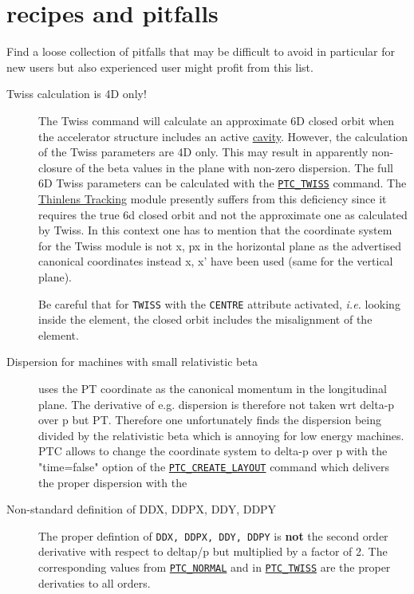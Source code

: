 
\chapter{\madx recipes and pitfalls}

Find a loose collection of pitfalls that may be difficult to avoid in
particular for new users but also experienced user might profit from
this list.  


\begin{description}

\item[Twiss calculation is 4D only!]  The Twiss command will calculate
  an approximate 6D closed orbit when the accelerator structure includes
  an active \hyperref[sec:rf-cavity]{cavity}. However, the calculation of
  the Twiss parameters are 4D only. This may result in apparently
  non-closure of the beta values in the plane with non-zero
  dispersion. The full 6D Twiss parameters can be calculated with the
  \hyperref[chap:ptc-twiss]{\texttt{PTC\_TWISS}} command.  The
  \hyperref[chap:thintrack]{Thinlens Tracking} module presently suffers
  from this deficiency since it requires the true 6d closed orbit and
  not the approximate one as calculated by Twiss. In this context one
  has to mention that the coordinate system for the Twiss module is not
  x, px in the horizontal plane as the advertised canonical coordinates
  instead x, x' have been used (same for the vertical plane).
  
  Be careful that for \texttt{TWISS} with the \texttt{CENTRE} attribute
  activated, \textsl{i.e.} looking inside the element, the closed orbit
  includes the misalignment of the element.  

  
\item[Dispersion for machines with small relativistic beta] 
  \madx uses the PT coordinate as the canonical momentum in the
  longitudinal plane. The derivative of e.g. dispersion is therefore
  not taken wrt delta-p over p but PT. Therefore one unfortunately finds the
  dispersion being divided by the relativistic beta which is annoying
  for low energy machines. PTC allows to change the coordinate system
  to  delta-p over p with the "time=false" option of the
  \hyperref[sec:ptc-create-layout]{\texttt{PTC\_CREATE\_LAYOUT}}
  command which delivers the proper dispersion with the


\item[Non-standard definition of DDX, DDPX, DDY, DDPY] 
  The \madx proper defintion of \texttt{DDX, DDPX, DDY, DDPY} is
  \textbf{not} the second order derivative with respect to deltap/p but
  multiplied by a factor of 2. The corresponding values from
  \hyperref[chap:ptc-normal]{\texttt{PTC\_NORMAL}} and in
  \hyperref[chap:ptc-twiss]{\texttt{PTC\_TWISS}} are the proper
  derivaties to all orders. 
  


\end{description}
